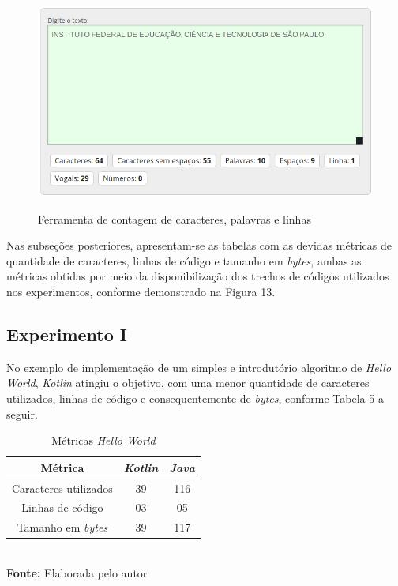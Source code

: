 \FloatBarrier
\begin{figure}[!htbp]
	\centering
		\caption{Ferramenta de contagem de caracteres, palavras e linhas}
	\includegraphics[scale=0.8]{imagens/4devs}
	\label{fig:figura3}
\end{figure}
\FloatBarrier

Nas subseções posteriores, apresentam-se as tabelas com as devidas métricas de quantidade de caracteres, linhas de código e tamanho em \textit{bytes}, ambas as métricas obtidas por meio da disponibilização dos trechos de códigos utilizados nos experimentos, conforme demonstrado na Figura 13.

\subsection{Experimento I}

No exemplo de implementação de um simples e introdutório algoritmo de \textit{Hello World}, \textit{Kotlin} atingiu o objetivo, com uma menor quantidade de caracteres utilizados, linhas de código e consequentemente de \textit{bytes}, conforme Tabela 5 a seguir.

\FloatBarrier
\begin{table}[!htbp]
\centering
\caption{Métricas \textit{Hello World}}
	\begin{tabular}{ c | c | c }
		\hline
           \textbf{Métrica} &            \textbf{\textit{Kotlin}}    & \textbf{\textit{Java}}  \\ \hline
		
		  Caracteres utilizados   &     39 	           &             116     \\ \hline
		             
		  Linhas de código        &     03             &             05       \\ \hline
		             
		  Tamanho em \textit{bytes}        &     39             &             117      \\ \hline
		  
	\end{tabular}
	\\ \vspace{0.2cm}
	\textbf{Fonte:} Elaborada pelo autor
	\label{tab:exemplo}
\end{table}
\FloatBarrier

